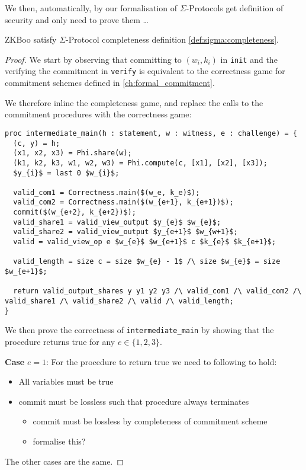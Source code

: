 We then, automatically, by our formalisation of $\Sigma$-Protocols get
definition of security and only need to prove them \dots {}

\begin{lemma}
  \label{lem:zkboo:correctness}
  ZKBoo satisfy $\Sigma$-Protocol completeness definition \ref{def:sigma:completeness}.
\end{lemma}
\begin{proof}
We start by observing that committing to $(w_{i}, k_{i})$ in \texttt{init} and
the verifying the commitment in \texttt{verify} is equivalent to the correctness
game for commitment schemes defined in \ref{ch:formal_commitment}.

We therefore inline the completeness game, and replace the calls to the
commitment procedures with the correctness game:

\begin{lstlisting}[mathescape, label=lst:zkboo-inter-completeness,caption=
Intermediate game for completeness]
proc intermediate_main(h : statement, w : witness, e : challenge) = {
  (c, y) = h;
  (x1, x2, x3) = Phi.share(w);
  (k1, k2, k3, w1, w2, w3) = Phi.compute(c, [x1], [x2], [x3]);
  $y_{i}$ = last 0 $w_{i}$;

  valid_com1 = Correctness.main($(w_e, k_e)$);
  valid_com2 = Correctness.main($(w_{e+1}, k_{e+1})$);
  commit($(w_{e+2}, k_{e+2})$);
  valid_share1 = valid_view_output $y_{e}$ $w_{e}$;
  valid_share2 = valid_view_output $y_{e+1}$ $w_{w+1}$;
  valid = valid_view_op e $w_{e}$ $w_{e+1}$ c $k_{e}$ $k_{e+1}$;

  valid_length = size c = size $w_{e} - 1$ /\ size $w_{e}$ = size $w_{e+1}$;

  return valid_output_shares y y1 y2 y3 /\ valid_com1 /\ valid_com2 /\ valid_share1 /\ valid_share2 /\ valid /\ valid_length;
}
\end{lstlisting}

We then prove the correctness of \texttt{intermediate\_main} by showing that
the procedure returns true for any $e \in \{1,2,3\}$.

\vspace{3mm}
\noindent
\textbf{Case} $e = 1$:
For the procedure to return true we need to following to hold:

\begin{itemize}
  \item All variables must be true
  \item commit must be lossless such that procedure always terminates
    \begin{itemize}
      \item commit must be lossless by completeness of commitment scheme
      \item formalise this?
    \end{itemize}
\end{itemize}

The other cases are the same.

\end{proof}

